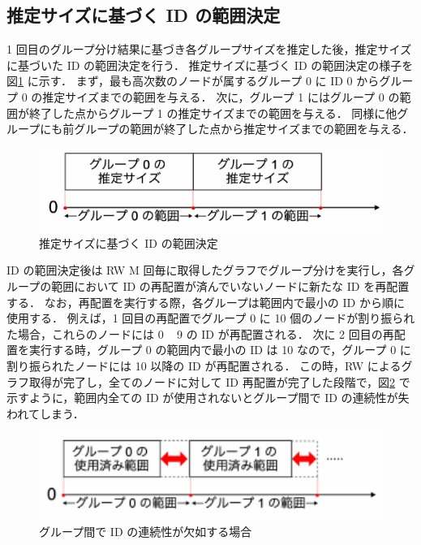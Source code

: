 \subsection{推定サイズに基づく ID の範囲決定}
1 回目のグループ分け結果に基づき各グループサイズを推定した後，推定サイズに基づいた ID の範囲決定を行う．
推定サイズに基づく ID の範囲決定の様子を図\ref{group_id_range} に示す．
まず，最も高次数のノードが属するグループ 0 に ID 0 からグループ 0 の推定サイズまでの範囲を与える． 
次に，グループ 1 にはグループ 0 の範囲が終了した点からグループ 1 の推定サイズまでの範囲を与える．
同様に他グループにも前グループの範囲が終了した点から推定サイズまでの範囲を与える．
\begin{figure}[t]
  \centering
  \includegraphics[width=12cm]{./figure/group_id_range.pdf}
  \caption{推定サイズに基づく ID の範囲決定}
  \label{group_id_range}
\end{figure}
ID の範囲決定後は RW M 回毎に取得したグラフでグループ分けを実行し，各グループの範囲において ID の再配置が済んでいないノードに新たな ID を再配置する．
なお，再配置を実行する際，各グループは範囲内で最小の ID から順に使用する．
例えば，1 回目の再配置でグループ 0 に 10 個のノードが割り振られた場合，これらのノードには 0 ~ 9 の ID が再配置される． 
次に 2 回目の再配置を実行する時，グループ 0 の範囲内で最小の ID は 10 なので，グループ 0 に割り振られたノードには 10 以降の ID が再配置される．
この時，RW によるグラフ取得が完了し，全てのノードに対して ID 再配置が完了した段階で，図\ref{dbg-ee_not_consecutive} で示すように，範囲内全ての ID が使用されないとグループ間で ID の連続性が失われてしまう．
\begin{figure}[t]
  \centering
  \includegraphics[width=12cm]{./figure/dbg-ee_not_consecutive.pdf}
  \caption{グループ間で ID の連続性が欠如する場合}
  \label{dbg-ee_not_consecutive}
\end{figure}

